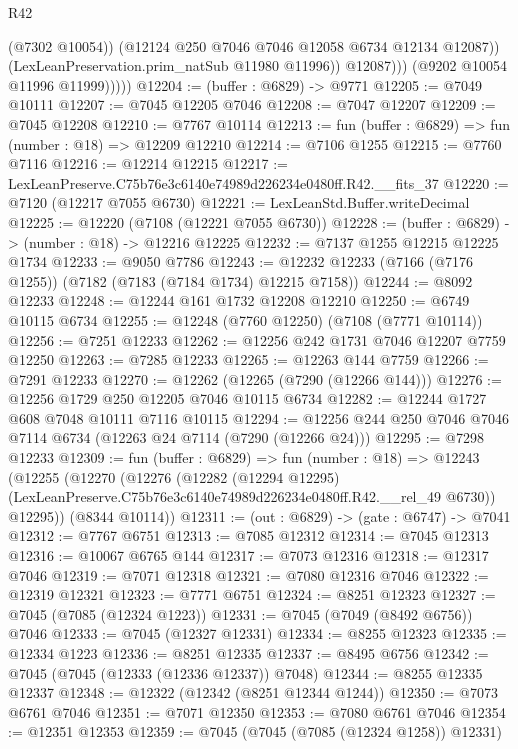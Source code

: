 \begin{lexlean}{R42}
\begin{coremodule}
{                        (@7302 @10054))
                      (@12124 @250 @7046 @7046 @12058 @6734 @12134 @12087))
                    (LexLeanPreservation.prim_natSub @11980 @11996))
                  @12087)))
            (@9202 @10054 @11996 @11999)))))
@12204 := (buffer : @6829) -> @9771
@12205 := @7049 @10111
@12207 := @7045 @12205 @7046
@12208 := @7047 @12207
@12209 := @7045 @12208
@12210 := @7767 @10114
@12213 := fun (buffer : @6829) => fun (number : @18) => @12209 @12210
@12214 := @7106 @1255
@12215 := @7760 @7116
@12216 := @12214 @12215
@12217 := LexLeanPreserve.C75b76e3c6140e74989d226234e0480ff.R42.__fits_37
@12220 := @7120 (@12217 @7055 @6730)
@12221 := LexLeanStd.Buffer.writeDecimal
@12225 := @12220 (@7108 (@12221 @7055 @6730))
@12228 := (buffer : @6829) -> (number : @18) -> @12216 @12225
@12232 := @7137 @1255 @12215 @12225 @1734
@12233 := @9050 @7786
@12243 := @12232 @12233 (@7166 (@7176 @1255)) (@7182 (@7183 (@7184 @1734) @12215 @7158))
@12244 := @8092 @12233
@12248 := @12244 @161 @1732 @12208 @12210
@12250 := @6749 @10115 @6734
@12255 := @12248 (@7760 @12250) (@7108 (@7771 @10114))
@12256 := @7251 @12233
@12262 := @12256 @242 @1731 @7046 @12207 @7759 @12250
@12263 := @7285 @12233
@12265 := @12263 @144 @7759
@12266 := @7291 @12233
@12270 := @12262 (@12265 (@7290 (@12266 @144)))
@12276 := @12256 @1729 @250 @12205 @7046 @10115 @6734
@12282 := @12244 @1727 @608 @7048 @10111 @7116 @10115
@12294 := @12256 @244 @250 @7046 @7046 @7114 @6734 (@12263 @24 @7114 (@7290 (@12266 @24)))
@12295 := @7298 @12233
@12309 := fun (buffer : @6829) =>
  fun (number : @18) =>
  @12243
    (@12255
      (@12270
        (@12276
          (@12282
            (@12294 @12295)
            (LexLeanPreserve.C75b76e3c6140e74989d226234e0480ff.R42.__rel_49 @6730))
          @12295))
      (@8344 @10114))
@12311 := (out : @6829) -> (gate : @6747) -> @7041
@12312 := @7767 @6751
@12313 := @7085 @12312
@12314 := @7045 @12313
@12316 := @10067 @6765 @144
@12317 := @7073 @12316
@12318 := @12317 @7046
@12319 := @7071 @12318
@12321 := @7080 @12316 @7046
@12322 := @12319 @12321
@12323 := @7771 @6751
@12324 := @8251 @12323
@12327 := @7045 (@7085 (@12324 @1223))
@12331 := @7045 (@7049 (@8492 @6756)) @7046
@12333 := @7045 (@12327 @12331)
@12334 := @8255 @12323
@12335 := @12334 @1223
@12336 := @8251 @12335
@12337 := @8495 @6756
@12342 := @7045 (@7045 (@12333 (@12336 @12337)) @7048)
@12344 := @8255 @12335 @12337
@12348 := @12322 (@12342 (@8251 @12344 @1244))
@12350 := @7073 @6761 @7046
@12351 := @7071 @12350
@12353 := @7080 @6761 @7046
@12354 := @12351 @12353
@12359 := @7045 (@7045 (@7085 (@12324 @1258)) @12331)
}
\end{coremodule}
\end{lexlean}
